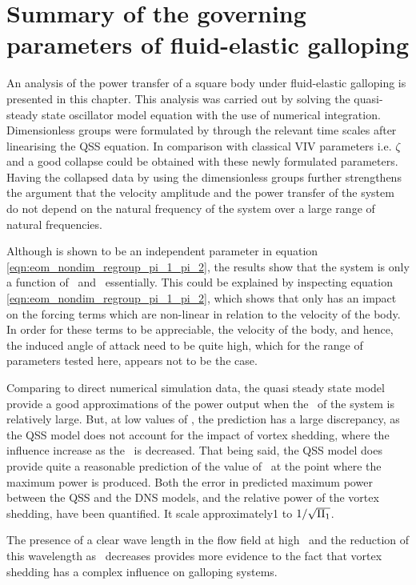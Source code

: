 \section{Summary of the governing parameters of  fluid-elastic galloping}
\label{sec:summary-pi_1-pi_2}

An analysis of the power transfer of a square body under fluid-elastic galloping is presented in this chapter. This analysis was carried out by solving the quasi-steady state oscillator model equation with the use of numerical integration. Dimensionless groups were formulated by through the relevant time scales after linearising the QSS equation. In comparison with classical VIV parameters i.e. $\zeta$ and \ustar a good collapse could be obtained with these newly formulated parameters. Having the collapsed data by using the dimensionless groups further strengthens the argument that the velocity amplitude and the power transfer of the system do not depend on the natural frequency of the system over a large range of natural frequencies.


Although \mstar is shown to be an independent parameter in equation \ref{eqn:eom_nondim_regroup_pi_1_pi_2}, the results show that the system is only a function of \massstiff\ and \massdamp\ essentially. This could be explained by inspecting equation \ref{eqn:eom_nondim_regroup_pi_1_pi_2}, which shows that \mstar only has an impact on the forcing terms which are non-linear in relation to the velocity of the body. In order for these terms to be appreciable, the velocity of the body, and hence, the induced angle of attack need to be quite high, which for the range of parameters tested here, appears not to be the case. 

Comparing to direct numerical simulation data, the quasi steady state model provide a good approximations of the power output when the \massstiff\ of the system is relatively large. But, at low values of \massstiff, the prediction has a large discrepancy, as the QSS model does not account for the impact of vortex shedding, where the influence increase as the \massstiff\ is decreased. That being said, the QSS model does provide quite a reasonable prediction of the value of \massstiff\ at the point where the maximum power is produced. Both the error in predicted maximum power between the QSS and the DNS models, and the relative power of the vortex shedding, have been quantified. It scale approximately1 to $1/\sqrt{\Pi_1}$.

The presence of a clear wave length in the flow field at high \massstiff\ and the reduction of this wavelength as \massstiff\ decreases provides more evidence to the fact that vortex shedding has a complex influence on galloping systems.  





    



